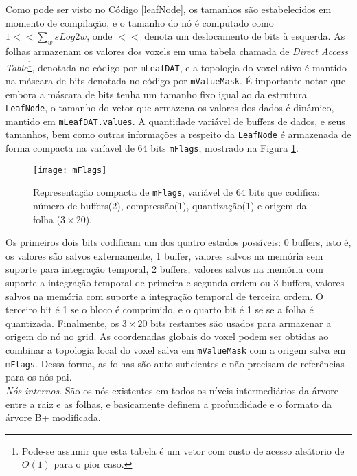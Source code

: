 Como pode ser visto no Código \ref{leafNode}, os tamanhos são estabelecidos em momento de compilação, e o tamanho do nó é computado como $1 << \sum_{w} sLog2w$, onde $<<$ denota um deslocamento de bits à esquerda. As folhas armazenam os valores dos voxels em uma tabela chamada de {\it Direct Access Table}\footnote{Pode-se assumir que esta tabela é um vetor com custo de acesso aleátorio de $O(1)$ para o pior caso.}, denotada no código por \texttt{mLeafDAT}, e a topologia do voxel ativo é mantido na máscara de bits denotada no código por \texttt{mValueMask}. É importante notar que embora a máscara de bits tenha um tamanho fixo igual ao da estrutura \texttt{LeafNode}, o tamanho do vetor que armazena os valores dos dados é dinâmico, mantido em \texttt{mLeafDAT.values}. A quantidade variável de buffers de dados, e seus tamanhos, bem como outras informações a respeito da \texttt{LeafNode} é armazenada de forma compacta na varíavel de 64 bits \texttt{mFlags}, mostrado na Figura \ref{mFlags}.

\begin{figure}[!htb]
\center
\texttt{[image: mFlags]}
\caption{Representação compacta de \texttt{mFlags}, variável de 64 bits que codifica: número de buffers(2), compressão(1), quantização(1) e origem da folha ($3 \times 20$).}
\label{mFlags}
\end{figure}

Os primeiros dois bits codificam um dos quatro estados possíveis: 0 buffers, isto é, os valores são salvos externamente, 1 buffer, valores salvos na memória sem suporte para integração temporal, 2 buffers, valores salvos na memória com suporte a integração temporal de primeira e segunda ordem ou 3 buffers, valores salvos na memória com suporte a integração temporal de terceira ordem. O terceiro bit é 1 se o bloco é comprimido, e o quarto bit é 1 se se a folha é quantizada. Finalmente, os $3 \times 20$ bits restantes são usados para armazenar a origem do nó no grid. As coordenadas globais do voxel podem ser obtidas ao combinar a topologia local do voxel salva em \texttt{mValueMask} com a origem salva em \texttt{mFlags}. Dessa forma, as folhas são auto-suficientes e não precisam de referências para os nós pai. \\

\emph{Nós internos}. São os nós existentes em todos os níveis intermediários da árvore entre a raiz e as folhas, e basicamente definem a profundidade e o formato da árvore B+ modificada.  



